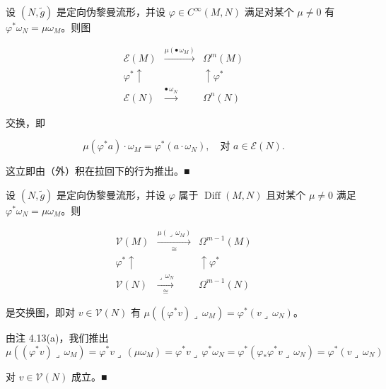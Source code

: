 \begin{remark}

\begin{items}
\item

设 $ (N,\tilde{g}) $ 是定向伪黎曼流形，并设 $ \varphi \in C^\infty(M,N) $ 满足对某个 $ \mu \ne 0 $ 有 $ \varphi^{*}\omega_N = \mu\omega_M $。则图

\begin{equation*}
\begin{array}{ccc} \mathcal{E}(M) & \xrightarrow{\mu(\bullet\,\omega_{M})} & \Omega^{m}(M) \\ \varphi^{*}\uparrow & & \uparrow\varphi^{*} \\ \mathcal{E}(N) & \xrightarrow{\bullet\,\omega_{N}} & \Omega^{n}(N) \end{array}
\end{equation*}

交换，即

\[
\mu(\varphi^{*}a)\cdot\omega_{M} = \varphi^{*}(a\cdot\omega_{N}), \quad \text{对 } a \in \mathcal{E}(N).
\]

\proofhead
这立即由（外）积在拉回下的行为推出。\nobreak\hspace{0.35em}■
\item

设 $ (N,\tilde{g}) $ 是定向伪黎曼流形，并设 $ \varphi $ 属于 $ \operatorname{Diff}(M,N) $ 且对某个 $ \mu \ne 0 $ 满足 $ \varphi^{*}\omega_N = \mu\omega_M $。则

\begin{equation*}
\begin{array}{ccc} \mathcal{V}(M) & \xrightarrow[\cong]{\mu(\lrcorner\,\omega_{M})} & \Omega^{m-1}(M) \\ \varphi^{*}\uparrow & & \uparrow\varphi^{*} \\ \mathcal{V}(N) & \xrightarrow[\cong]{\lrcorner\,\omega_{N}} & \Omega^{m-1}(N) \end{array}
\end{equation*}

是交换图，即对 $ v \in \mathcal{V}(N) $ 有 $ \mu((\varphi^{*}v)\lrcorner\,\omega_M) = \varphi^{*}(v\lrcorner\,\omega_N) $。

\proofhead
由注 4.13(a)，我们推出
\[
\mu((\varphi^{*}v)\lrcorner\,\omega_{M}) = \varphi^{*}v\lrcorner\,(\mu\omega_{M}) = \varphi^{*}v\lrcorner\,\varphi^{*}\omega_{N} = \varphi^{*}(\varphi_{*}\varphi^{*}v\lrcorner\,\omega_{N}) = \varphi^{*}(v\lrcorner\,\omega_{N})
\]

对 $ v \in \mathcal{V}(N) $ 成立。\nobreak\hspace{0.35em}■


\end{items}
\end{remark}
